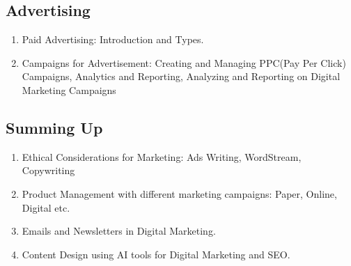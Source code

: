 \subsection{Advertising}
\begin{enumerate}
    \item Paid Advertising: Introduction and Types.
    \item Campaigns for Advertisement: Creating and Managing PPC(Pay Per Click) Campaigns, Analytics and Reporting, Analyzing and Reporting on Digital Marketing Campaigns
\end{enumerate}

\subsection{Summing Up}
\begin{enumerate}
    \item Ethical Considerations for Marketing: Ads Writing, WordStream, Copywriting
    \item Product Management with different marketing campaigns: Paper, Online, Digital etc.
    \item Emails and Newsletters in Digital Marketing.
    \item Content Design using AI tools for Digital Marketing and SEO.
\end{enumerate}